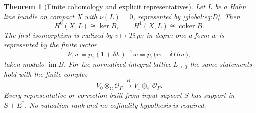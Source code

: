 \documentclass[11pt,letterpaper]{article}
\newtheorem{theorem}{Theorem}[section]
\theoremstyle{definition}
\theoremstyle{remark}
\newcommand{\C}{\mathbb C}
\newcommand{\OO}{\mathcal O}
\newcommand{\coker}{\operatorname{coker}}
\newcommand{\im}{\operatorname{im}}
\numberwithin{equation}{section}
\begin{document}
\begin{theorem}[Finite cohomology and explicit representatives]\label{global:thm:finitecoh}
Let $L$ be a Hahn line bundle on compact $X$ with $\nu(L)=0$, represented by \eqref{global:eq:D}. Then
\begin{equation}\label{global:eq:finitecohomology}
  H^0(X,L)\cong\ker B,\qquad H^1(X,L)\cong\coker B .
\end{equation}
The first isomorphism is realized by $v\mapsto Ti_0v$; in degree one a form $w$ is represented by the finite vector
\begin{equation}\label{global:eq:P1}
  P_1w=p_1(1+\delta h)^{-1}w=p_1\bigl(w-\delta Thw\bigr),
\end{equation}
taken modulo $\im B$. For the normalized integral lattice $L_{\ge0}$ the same statements hold with the finite complex
\begin{equation}\label{global:eq:integralcomplex}
  V_0\otimes_\C\OO_\Gamma\xrightarrow{\ B\ }V_1\otimes_\C\OO_\Gamma .
\end{equation}
Every representative or correction built from input support $S$ has support in $S+E^*$. No valuation-rank and no cofinality hypothesis is required.
\end{theorem}
\end{document}
